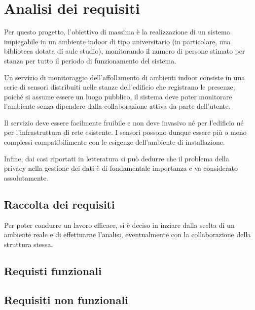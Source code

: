 \section{Analisi dei requisiti}



Per questo progetto, l'obiettivo di massima è la realizzazione di un sistema impiegabile in un ambiente indoor di tipo universitario (in particolare, una biblioteca dotata di aule studio),
monitorando il numero di persone stimato per stanza per tutto il periodo di funzionamento del sistema.

Un servizio di monitoraggio dell'affollamento di ambienti indoor consiste in una serie di sensori distribuiti nelle stanze dell'edificio che registrano le presenze;
poiché si assume essere un luogo pubblico, il sistema deve poter monitorare l'ambiente senza dipendere dalla collaborazione attiva da parte dell'utente.

Il servizio deve essere facilmente fruibile e non deve invasivo né per l'edificio né per l'infrastruttura di rete esistente.
I sensori possono dunque essere più o meno complessi compatibilimente con le esigenze dell'ambiente di installazione.

Infine, dai casi riportati in letteratura si può dedurre che il problema della privacy nella gestione dei dati è di fondamentale importanza e va considerato assolutamente.

\subsection{Raccolta dei requisiti}

Per poter condurre un lavoro efficace, si è deciso in inziare dalla scelta di un ambiente reale e di effettuarne l'analisi, eventualmente con la collaborazione della struttura stessa.


\subsection{Requisti funzionali}

\subsection{Requisiti non funzionali}
